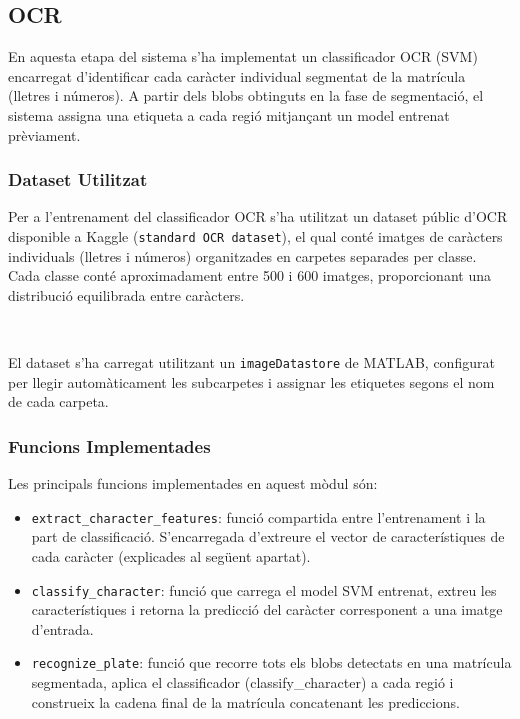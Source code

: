 \subsection{OCR}

En aquesta etapa del sistema s'ha implementat un classificador OCR (SVM) encarregat d'identificar cada caràcter individual segmentat de la matrícula (lletres i números). A partir dels blobs obtinguts en la fase de segmentació, el sistema assigna una etiqueta a cada regió mitjançant un model entrenat prèviament.

\subsubsection{Dataset Utilitzat}

Per a l'entrenament del classificador OCR s'ha utilitzat un dataset públic d'OCR disponible a Kaggle (\texttt{standard OCR dataset}), el qual conté imatges de caràcters individuals (lletres i números) organitzades en carpetes separades per classe. Cada classe conté aproximadament entre 500 i 600 imatges, proporcionant una distribució equilibrada entre caràcters.

\

El dataset s'ha carregat utilitzant un \texttt{imageDatastore} de MATLAB, configurat per llegir automàticament les subcarpetes i assignar les etiquetes segons el nom de cada carpeta. 


\subsubsection{Funcions Implementades}

Les principals funcions implementades en aquest mòdul són:

\begin{itemize}
    \item \texttt{extract\_character\_features}: funció compartida entre l'entrenament i la part de classificació. S'encarregada d'extreure el vector de característiques de cada caràcter (explicades al següent apartat).
    
    \item \texttt{classify\_character}: funció que carrega el model SVM entrenat, extreu les característiques i retorna la predicció del caràcter corresponent a una imatge d'entrada.
    
    \item \texttt{recognize\_plate}: funció que recorre tots els blobs detectats en una matrícula segmentada, aplica el classificador (classify\_character) a cada regió i construeix la cadena final de la matrícula concatenant les prediccions.
\end{itemize}

